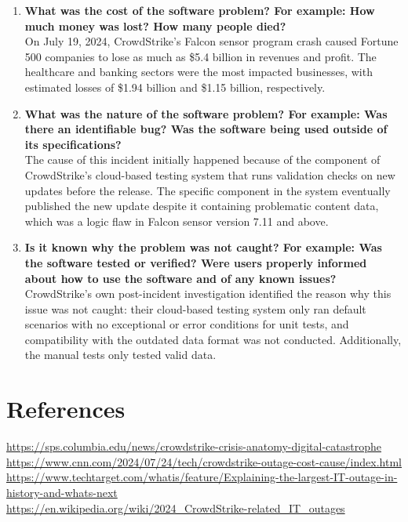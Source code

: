 \documentclass[10pt]{article}
\begin{document}
\begin{enumerate}
      \item \textbf{What was the cost of the software problem? For example: How much money was lost? How many people died?}
            \\ On July 19, 2024, CrowdStrike’s Falcon sensor program crash caused Fortune 500 companies to lose as much as \$5.4 billion in revenues and profit. The healthcare and banking sectors were the most impacted businesses, with estimated losses of \$1.94 billion and \$1.15 billion, respectively.

      \item \textbf{What was the nature of the software problem? For example: Was there an identifiable bug? Was the software being used outside of its specifications?}
            \\ The cause of this incident initially happened because of the component of CrowdStrike’s cloud-based testing system that runs validation checks on new updates before the release. The specific component in the system eventually published the new update despite it containing problematic content data, which was a logic flaw in Falcon sensor version 7.11 and above.

      \item \textbf{Is it known why the problem was not caught? For example: Was the software tested or verified? Were users properly informed about how to use the software and of any known issues?}
            \\ CrowdStrike's own post-incident investigation identified the reason why this issue was not caught: their cloud-based testing system only ran default scenarios with no exceptional or error conditions for unit tests, and compatibility with the outdated data format was not conducted. Additionally, the manual tests only tested valid data.
\end{enumerate}

\section*{References}
\url{https://sps.columbia.edu/news/crowdstrike-crisis-anatomy-digital-catastrophe}
\\
\url{https://www.cnn.com/2024/07/24/tech/crowdstrike-outage-cost-cause/index.html}
\\
\url{https://www.techtarget.com/whatis/feature/Explaining-the-largest-IT-outage-in-history-and-whats-next}
\\
\url{https://en.wikipedia.org/wiki/2024_CrowdStrike-related_IT_outages}
\end{document}
